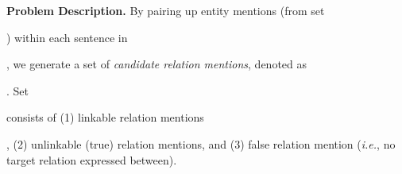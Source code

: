 \documentclass[letterpaper]{sig-alternate-2013}
\def\ie{{\sl i.e.}}
\begin{document}
\smallskip\noindent
\textbf{\small \textsf{Problem Description.}}
By pairing up entity mentions (from set \begin{small}\end{small}) within each sentence in \begin{small}\end{small}, we generate a set of \textit{candidate relation mentions}, denoted as \begin{small}\end{small}. Set \begin{small}\end{small} consists of (1) linkable relation mentions \begin{small}\end{small}, (2) unlinkable (true) relation mentions, and (3) false relation mention (\ie, no target relation expressed between).
\end{document}
